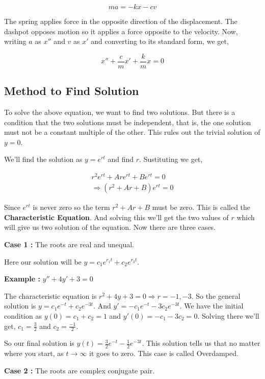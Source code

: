 $$ ma = -kx - cv $$

The spring applies force in the opposite direction of the displacement.
The dashpot opposes motion so it applies a force opposite to the velocity.
Now, writing $a$ as $x''$ and $v$ as $x'$ and converting to its standard form, we get,

$$ x'' + \frac{c}{m}x' + \frac{k}{m}x = 0 $$


\subsection{Method to Find Solution}

To solve the above equation, we want to find two solutions.
But there is a condition that the two solutions must be independent, 
that is, the one solution must not be a constant multiple of the other.
This rules out the trivial solution of $y = 0$. 

We'll find the solution as $y = e^{rt}$ and find $r$. 
Sustituting we get,

\begin{gather*}
    r^2 e^{rt} + Ar e^{rt} + B e^{rt} = 0 \\
    \Rightarrow (r^2 + Ar + B) e^{rt} = 0
\end{gather*}

Since $e^{rt}$ is never zero so the term $r^2 + Ar + B$ must be zero. 
This is called the {\bf Characteristic Equation}.
And solving this we'll get the two values of $r$ which will give us two solution of the equation.
Now there are three cases.

{\bf Case 1 : } The roots are real and unequal.
 
Here our solution will be $y = c_1 e^{r_1 t} + c_2 e^{r_2 t}$.

{\bf Example : } $y'' + 4y' + 3 = 0$

The characteristic equation is $r^2 + 4y + 3 = 0 \Rightarrow r = -1, -3$.
So the general solution is $y = c_1 e^{-t} + c_2 e^{-3t}$.
And $y' = -c_1 e^{-t} - 3c_2 e^{-3t}$.
We have the initial condition as $y(0) = c_1 + c_2 = 1$ and $y'(0) = -c_1 - 3c_2 = 0$.
Solving there we'll get, $c_1 = \frac{3}{2}$ and $c_2 = \frac{-1}{2}$. 

So our final solution is $y(t) = \frac{3}{2}e^{-t} - \frac{1}{2} e^{-3t}$.
This solution tells us that no matter where you start, as $t \to \infty$ it goes to zero.
This case is called Overdamped.

{\bf Case 2 : } The roots are complex conjugate pair.

